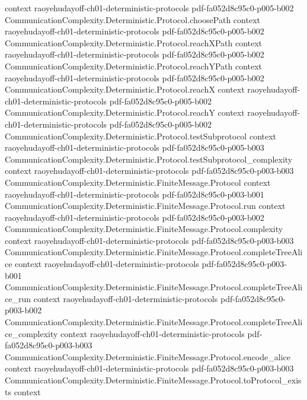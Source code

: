 \begin{lemma}
  {context}
  {raoyehudayoff-ch01-deterministic-protocols}
  {pdf-fa052d8c95c0-p005-b002}
\proofstep
  {CommunicationComplexity.Deterministic.Protocol.choosePath}
  {context}
  {raoyehudayoff-ch01-deterministic-protocols}
  {pdf-fa052d8c95c0-p005-b002}
\proofstep
  {CommunicationComplexity.Deterministic.Protocol.reachXPath}
  {context}
  {raoyehudayoff-ch01-deterministic-protocols}
  {pdf-fa052d8c95c0-p005-b002}
\proofstep
  {CommunicationComplexity.Deterministic.Protocol.reachYPath}
  {context}
  {raoyehudayoff-ch01-deterministic-protocols}
  {pdf-fa052d8c95c0-p005-b002}
\proofstep
  {CommunicationComplexity.Deterministic.Protocol.reachX}
  {context}
  {raoyehudayoff-ch01-deterministic-protocols}
  {pdf-fa052d8c95c0-p005-b002}
\proofstep
  {CommunicationComplexity.Deterministic.Protocol.reachY}
  {context}
  {raoyehudayoff-ch01-deterministic-protocols}
  {pdf-fa052d8c95c0-p005-b002}
\proofstep
  {CommunicationComplexity.Deterministic.Protocol.testSubprotocol}
  {context}
  {raoyehudayoff-ch01-deterministic-protocols}
  {pdf-fa052d8c95c0-p005-b003}
\proofstep
  {CommunicationComplexity.Deterministic.Protocol.testSubprotocol_complexity}
  {context}
  {raoyehudayoff-ch01-deterministic-protocols}
  {pdf-fa052d8c95c0-p003-b003}
\proofstep
  {CommunicationComplexity.Deterministic.FiniteMessage.Protocol}
  {context}
  {raoyehudayoff-ch01-deterministic-protocols}
  {pdf-fa052d8c95c0-p003-b001}
\proofstep
  {CommunicationComplexity.Deterministic.FiniteMessage.Protocol.run}
  {context}
  {raoyehudayoff-ch01-deterministic-protocols}
  {pdf-fa052d8c95c0-p003-b002}
\proofstep
  {CommunicationComplexity.Deterministic.FiniteMessage.Protocol.complexity}
  {context}
  {raoyehudayoff-ch01-deterministic-protocols}
  {pdf-fa052d8c95c0-p003-b003}
\proofstep
  {CommunicationComplexity.Deterministic.FiniteMessage.Protocol.completeTreeAlice}
  {context}
  {raoyehudayoff-ch01-deterministic-protocols}
  {pdf-fa052d8c95c0-p003-b001}
\proofstep
  {CommunicationComplexity.Deterministic.FiniteMessage.Protocol.completeTreeAlice_run}
  {context}
  {raoyehudayoff-ch01-deterministic-protocols}
  {pdf-fa052d8c95c0-p003-b002}
\proofstep
  {CommunicationComplexity.Deterministic.FiniteMessage.Protocol.completeTreeAlice_complexity}
  {context}
  {raoyehudayoff-ch01-deterministic-protocols}
  {pdf-fa052d8c95c0-p003-b003}
\proofstep
  {CommunicationComplexity.Deterministic.FiniteMessage.Protocol.encode_alice}
  {context}
  {raoyehudayoff-ch01-deterministic-protocols}
  {pdf-fa052d8c95c0-p003-b003}
\proofstep
  {CommunicationComplexity.Deterministic.FiniteMessage.Protocol.toProtocol_exists}
  {context}

\end{lemma}
